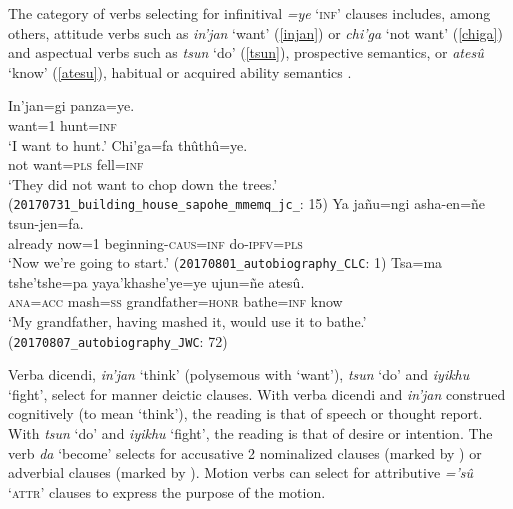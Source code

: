 \documentclass[output=paper,colorlinks,citecolor=brown]{langscibook}
\begin{document}
The category of verbs selecting for infinitival \emph{=ye} `\textsc{inf}' clauses includes, among others, attitude verbs such as \emph{in'jan} `want' (\ref{injan}) or \emph{chi'ga} `not want' (\ref{chiga}) and aspectual verbs such as \emph{tsun} `do' (\ref{tsun}), prospective semantics, or \emph{atesû} `know' (\ref{atesu}), habitual or acquired ability semantics \citep{fischerhengeveld}.
\begin{exe}
    \ex \label{injan} %
        \gll In'jan=gi {\ob}panza=ye.{\cb} \\
             want=\textsc{1} hunt=\textsc{inf} \\
        \glt `I want to hunt.'
    \ex \label{chiga} %
        \gll Chi'ga=fa          {{\ob}thûthû=ye.{\cb}}   \\
             {not want=\textsc{pls}}  {fell=\textsc{inf}} \\
        \glt `They did not want to chop down the trees.'
        \\ \hfill (\texttt{20170731\_building\_house\_sapohe\_mmemq\_jc\_}: {\textsc{15}})
    \ex \label{tsun} %
        \gll {\ob}Ya      jañu=ngi {asha-en=ñe{\cb}}    tsun-jen=fa.    \\
             already now\textsc{=}1 beginning-\textsc{caus=inf} do-\textsc{ipfv=pls} \\
        \glt `Now we're going to start.'
        \hfill (\texttt{20170801\_autobiography\_CLC}: {\textsc{1}})
    \ex \label{atesu} %
        \gll {\ob}Tsa=ma      {tshe'tshe=pa{\cb}} yaya'khashe'ye=ye   {{\ob}ujun=ñe{\cb}}      atesû. \\
             \textsc{ana=acc} mash=\textsc{ss}   grandfather=\textsc{honr} bathe=\textsc{inf} know \\
        \glt `My grandfather, having mashed it, would use it to bathe.'
        \\ \hfill (\texttt{20170807\_autobiography\_JWC}: {\textsc{72}})
\end{exe}
    
Verba dicendi, \emph{in'jan} `think' (polysemous with `want'), \emph{tsun} `do' and \emph{iyikhu} `fight', select for manner deictic  clauses. With verba dicendi and \emph{in'jan} construed cognitively (\ie to mean `think'), the reading is that of speech %
or thought report. %
With \emph{tsun} `do' and \emph{iyikhu} `fight', the reading is that of desire or intention. The verb \emph{da} `become' selects for accusative 2 nominalized clauses (marked by ) %
or adverbial clauses (marked by ). Motion verbs can select for attributive \emph{='sû} `\textsc{attr}' clauses to express the purpose of the motion.
\end{document}
